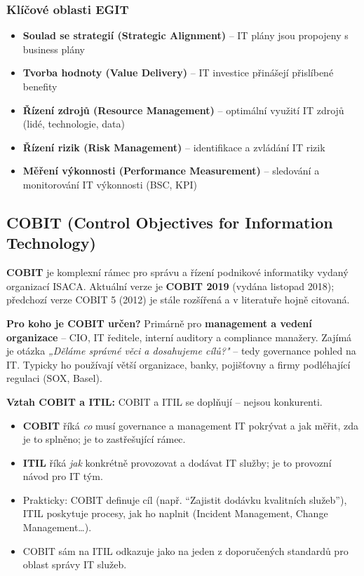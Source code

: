 \subsubsection{Klíčové oblasti EGIT}

\begin{itemize}
  \item \textbf{Soulad se strategií (Strategic Alignment)} -- IT plány jsou propojeny s business plány
  \item \textbf{Tvorba hodnoty (Value Delivery)} -- IT investice přinášejí přislíbené benefity
  \item \textbf{Řízení zdrojů (Resource Management)} -- optimální využití IT zdrojů (lidé, technologie, data)
  \item \textbf{Řízení rizik (Risk Management)} -- identifikace a zvládání IT rizik
  \item \textbf{Měření výkonnosti (Performance Measurement)} -- sledování a monitorování IT výkonnosti (BSC, KPI)
\end{itemize}

\subsection{COBIT (Control Objectives for Information Technology)}

\textbf{COBIT} je komplexní rámec pro správu a řízení podnikové informatiky vydaný organizací ISACA.
Aktuální verze je \textbf{COBIT 2019} (vydána listopad 2018); předchozí verze COBIT 5 (2012) je stále
rozšířená a v literatuře hojně citovaná.

\textbf{Pro koho je COBIT určen?}
Primárně pro \textbf{management a vedení organizace} -- CIO, IT ředitele, interní auditory a compliance manažery.
Zajímá je otázka \textit{„Děláme správné věci a dosahujeme cílů?"} -- tedy governance pohled na IT.
Typicky ho používají větší organizace, banky, pojišťovny a firmy podléhající regulaci (SOX, Basel).

\textbf{Vztah COBIT a ITIL:}
COBIT a ITIL se doplňují -- nejsou konkurenti.
\begin{itemize}
  \item \textbf{COBIT} říká \textit{co} musí governance a management IT pokrývat a jak měřit, zda je to splněno; je to zastřešující rámec.
  \item \textbf{ITIL} říká \textit{jak} konkrétně provozovat a dodávat IT služby; je to provozní návod pro IT tým.
  \item Prakticky: COBIT definuje cíl (např. ``Zajistit dodávku kvalitních služeb''), ITIL poskytuje procesy, jak ho naplnit (Incident Management, Change Management\ldots).
  \item COBIT sám na ITIL odkazuje jako na jeden z doporučených standardů pro oblast správy IT služeb.
\end{itemize}

